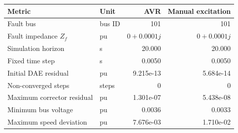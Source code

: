 \begin{tabular}{llrr}\toprule {Metric} & {Unit} & {AVR} & {Manual excitation}\\ \midrule
Fault bus & bus ID & 101 & 101\\
Fault impedance $Z_f$ & pu & {$0+0.0001j$} & {$0+0.0001j$}\\
Simulation horizon & s & 20.000 & 20.000\\
Fixed time step & s & 0.0050 & 0.0050\\
Initial DAE residual & pu & 9.215e-13 & 5.684e-14\\
Non-converged steps & steps & 0 & 0\\
Maximum corrector residual & pu & 1.301e-07 & 5.438e-08\\
Minimum bus voltage & pu & 0.0036 & 0.0033\\
Maximum speed deviation & pu & 7.676e-03 & 1.710e-02\\
\bottomrule\end{tabular}
